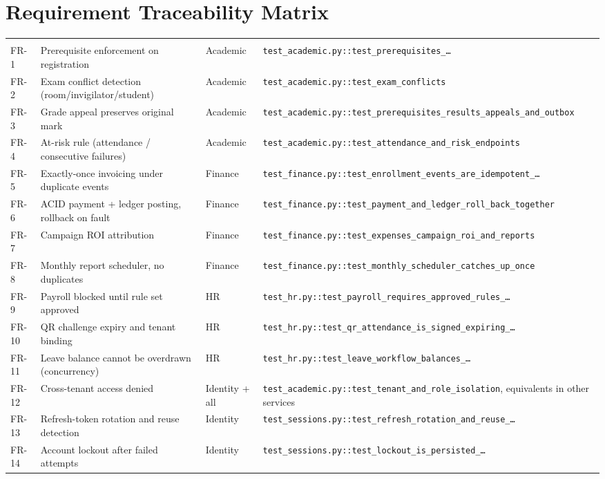 \section{Requirement Traceability Matrix}
\label{app:trace}
\begin{longtable}{L{1.4cm}L{6.7cm}L{3.0cm}L{2.6cm}}
  \toprule
   &  &  &  \\
  \midrule
  \endfirsthead
   &  &  &  \\
  \midrule
  \endhead
  FR-1 & Prerequisite enforcement on registration & Academic & \texttt{test\_academic.py::test\_prerequisites\_\dots} \\
  FR-2 & Exam conflict detection (room/invigilator/student) & Academic & \texttt{test\_academic.py::test\_exam\_conflicts} \\
  FR-3 & Grade appeal preserves original mark & Academic & \texttt{test\_academic.py::test\_prerequisites\_results\_appeals\_and\_outbox} \\
  FR-4 & At-risk rule (attendance / consecutive failures) & Academic & \texttt{test\_academic.py::test\_attendance\_and\_risk\_endpoints} \\
  FR-5 & Exactly-once invoicing under duplicate events & Finance & \texttt{test\_finance.py::test\_enrollment\_events\_are\_idempotent\_\dots} \\
  FR-6 & ACID payment + ledger posting, rollback on fault & Finance & \texttt{test\_finance.py::test\_payment\_and\_ledger\_roll\_back\_together} \\
  FR-7 & Campaign ROI attribution & Finance & \texttt{test\_finance.py::test\_expenses\_campaign\_roi\_and\_reports} \\
  FR-8 & Monthly report scheduler, no duplicates & Finance & \texttt{test\_finance.py::test\_monthly\_scheduler\_catches\_up\_once} \\
  FR-9 & Payroll blocked until rule set approved & HR & \texttt{test\_hr.py::test\_payroll\_requires\_approved\_rules\_\dots} \\
  FR-10 & QR challenge expiry and tenant binding & HR & \texttt{test\_hr.py::test\_qr\_attendance\_is\_signed\_expiring\_\dots} \\
  FR-11 & Leave balance cannot be overdrawn (concurrency) & HR & \texttt{test\_hr.py::test\_leave\_workflow\_balances\_\dots} \\
  FR-12 & Cross-tenant access denied & Identity + all & \texttt{test\_academic.py::test\_tenant\_and\_role\_isolation}, equivalents in other services \\
  FR-13 & Refresh-token rotation and reuse detection & Identity & \texttt{test\_sessions.py::test\_refresh\_rotation\_and\_reuse\_\dots} \\
  FR-14 & Account lockout after failed attempts & Identity & \texttt{test\_sessions.py::test\_lockout\_is\_persisted\_\dots} \\
  \bottomrule
\end{longtable}

